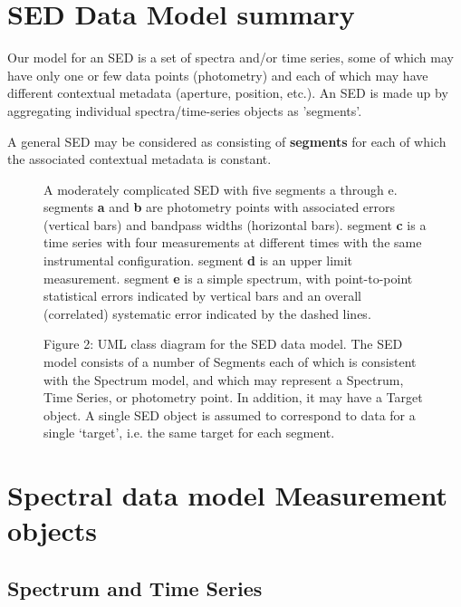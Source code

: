 \documentclass[11pt]{article}
\begin{document}
\section{SED Data Model summary}

Our model for an SED is a set of spectra and/or time series, some of
which may have only one or few data points (photometry) and  each of
which may have different contextual metadata  (aperture, position,
etc.). An SED is made up by aggregating individual spectra/time-series
objects as 'segments'.

A general SED may be considered as consisting of {\bf segments}
for each of which the associated contextual metadata is constant. 

\begin{figure}[h]
\caption[a]{A moderately complicated SED with five segments a through e.
segments {\bf a} and {\bf b} are photometry points with associated
errors (vertical bars) and bandpass widths (horizontal bars).
segment {\bf c} is a time series with four measurements at
different times with the same instrumental configuration. segment {\bf d }
is an upper limit measurement. segment {\bf e } is a simple spectrum, with
point-to-point statistical errors indicated by vertical bars and
an overall (correlated) systematic error indicated by the dashed lines.}
\end{figure}

\begin{figure}[h]

\colorbox{iblue}{
}
{
\colorbox{iblue}{
\begin{minipage}{6.0in}
Figure 2: 
UML class diagram for the SED data model. The SED model
consists of a number of Segments each of which is consistent
with the Spectrum model, and which may represent a Spectrum,
Time Series, or photometry point. In addition, it may have
a Target object. A single SED object is assumed to correspond 
to data for a single
`target', i.e. the same target for each segment.  
\end{minipage}
}
}
\end{figure}


\section{Spectral data model Measurement objects}

\subsection{Spectrum and Time Series}
\end{document}
